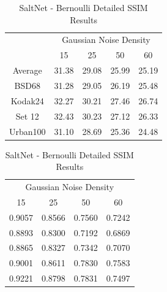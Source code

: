 \begin{table}[!hbt]
    \centering
    \begin{minipage}{0.48\textwidth} %
        \centering
        \begin{tabular}{ccccc}
            \hline
            & \multicolumn{4}{c}{Gaussian Noise Density} \\
            & 15 & 25 & 50 & 60 \\
            \hline
            Average & 31.38 & 29.08 & 25.99 & 25.19 \\
            \hline
            BSD68 & 31.28 & 29.05 & 26.19 & 25.48 \\
            Kodak24 & 32.27 & 30.21 & 27.46 & 26.74 \\
            Set 12 & 32.43 & 30.23 & 27.12 & 26.33 \\
            Urban100 & 31.10 & 28.69 & 25.36 & 24.48 \\        
            \hline
        \end{tabular}
        \caption{SaltNet - Bernoulli Detailed PSNR Results}
    \end{minipage}
    \hfill
    \vline
    \begin{minipage}{0.45\textwidth}
        \centering
        \begin{tabular}{cccc}
            \hline
            \multicolumn{4}{c}{Gaussian Noise Density} \\
            15 & 25 & 50 & 60 \\
            \hline
            0.9057 & 0.8566 & 0.7560 & 0.7242 \\
            \hline
            0.8893 & 0.8300 & 0.7192 & 0.6869 \\
            0.8865 & 0.8327 & 0.7342 & 0.7070 \\
            0.9001 & 0.8611 & 0.7830 & 0.7583 \\
            0.9221 & 0.8798 & 0.7831 & 0.7497 \\
            \hline
        \end{tabular}
        \caption{SaltNet - Bernoulli Detailed SSIM Results}
    \end{minipage}
    \end{table}

